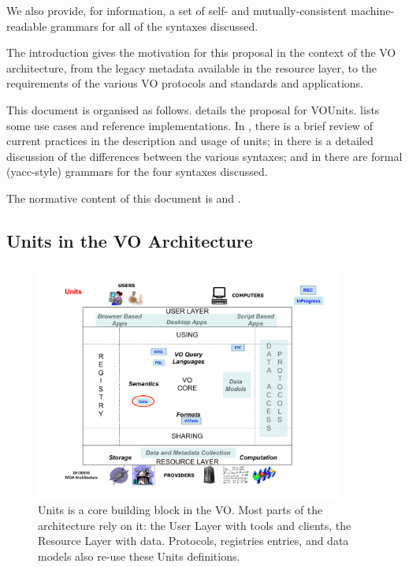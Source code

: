 \documentclass[11pt,notitlepage,onecolumn]{ivoa}
\begin{document}
We also provide, for information, a set of self- and mutually-consistent
machine-readable grammars for all of the syntaxes discussed.

The introduction gives the motivation for
this proposal in the context of the VO architecture, from the legacy 
metadata available in the resource layer, to the requirements of the various 
VO protocols and standards and applications.

This document is organised as follows. 
details the proposal for VOUnits.  lists some
use cases and reference implementations.  In ,
there is a brief review of current practices in the description and
usage of units; in  there is a detailed
discussion of the differences between the various syntaxes; and
in  there are formal (yacc-style) grammars for
the four syntaxes discussed.

The normative content of this document is  and .

\subsection{Units in the VO Architecture}

\renewcommand{\topfraction}{.85}
\renewcommand{\bottomfraction}{.7}
\renewcommand{\textfraction}{.15}
\renewcommand{\floatpagefraction}{.66}

\begin{figure}%
  \centerline{\includegraphics[width=0.9\textwidth]{unitsInIVOA.pdf}}
  \caption{Units is a core building block in the VO.  Most parts of the
  architecture rely on it: the User Layer with tools and clients, the
  Resource Layer with data.  Protocols, registries entries, and
  data models also re-use these Units definitions.}
  \label{fig:architecture}
\end{figure}
\end{document}
